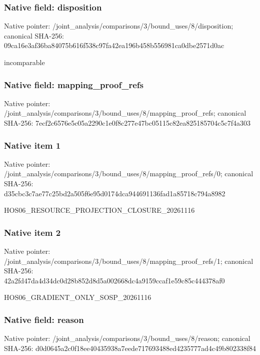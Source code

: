 \documentclass[10pt,a4paper]{article}
\begin{document}
\subsubsection{Native field: disposition}
Native pointer: /joint\_\allowbreak{}analysis/comparisons/3/bound\_\allowbreak{}uses/8/disposition; canonical SHA-256: 09ca16e3af36ba84075b616f538c97fa42ea196b458b556981ca0dbe2571d0ac

\begingroup\raggedright\sloppy incomparable\par\endgroup

\subsubsection{Native field: mapping\_\allowbreak{}proof\_\allowbreak{}refs}
Native pointer: /joint\_\allowbreak{}analysis/comparisons/3/bound\_\allowbreak{}uses/8/mapping\_\allowbreak{}proof\_\allowbreak{}refs; canonical SHA-256: 7ecf2c6576e5c05a2290c1e0f8c277e47bc05115c82ea825185704c5c7f4a303

\subsubsection{Native item 1}
Native pointer: /joint\_\allowbreak{}analysis/comparisons/3/bound\_\allowbreak{}uses/8/mapping\_\allowbreak{}proof\_\allowbreak{}refs/0; canonical SHA-256: d35cbc3c7ae77c25bd2a505f6e95d0174dca944691136fad1a85718c794a8982

\begingroup\raggedright\sloppy HOS06\_\allowbreak{}RESOURCE\_\allowbreak{}PROJECTION\_\allowbreak{}CLOSURE\_\allowbreak{}20261116\par\endgroup

\subsubsection{Native item 2}
Native pointer: /joint\_\allowbreak{}analysis/comparisons/3/bound\_\allowbreak{}uses/8/mapping\_\allowbreak{}proof\_\allowbreak{}refs/1; canonical SHA-256: 42a2fd47da4d34dc0d28b852d8d5a002668dc4a9159ccaf1e59c85c444378af0

\begingroup\raggedright\sloppy HOS06\_\allowbreak{}GRADIENT\_\allowbreak{}ONLY\_\allowbreak{}SOSP\_\allowbreak{}20261116\par\endgroup

\subsubsection{Native field: reason}
Native pointer: /joint\_\allowbreak{}analysis/comparisons/3/bound\_\allowbreak{}uses/8/reason; canonical SHA-256: d0d0645a2c0f18ee40435938a7eede717693488ed4235777ad4c49b802338f84
\end{document}
